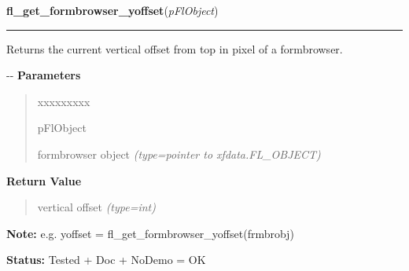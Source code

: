 \hspace{.8\funcindent}\begin{boxedminipage}{\funcwidth}

    \raggedright \textbf{fl\_get\_formbrowser\_yoffset}(\textit{pFlObject})

    \vspace{-1.5ex}

    \rule{\textwidth}{0.5\fboxrule}
\setlength{\parskip}{2ex}

Returns the current vertical offset from top in pixel of a
formbrowser.

-{}-
\setlength{\parskip}{1ex}
      \textbf{Parameters}
      \vspace{-1ex}

      \begin{quote}
        \begin{Ventry}{xxxxxxxxx}

          \item[pFlObject]


formbrowser object
            {\it (type=pointer to xfdata.FL\_OBJECT)}

        \end{Ventry}

      \end{quote}

      \textbf{Return Value}
    \vspace{-1ex}

      \begin{quote}

vertical offset
      {\it (type=int)}

      \end{quote}

\textbf{Note:} 
e.g. yoffset = fl\_get\_formbrowser\_yoffset(frmbrobj)


\textbf{Status:} 
Tested + Doc + NoDemo = OK


    \end{boxedminipage}

    \label{xformslib:flformbrowser:fl_find_formbrowser_form_number}

    \vspace{0.5ex}

